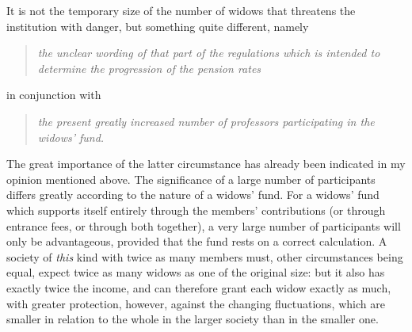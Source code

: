 It is not the temporary size of the number of widows that threatens the institution with danger, but something quite different, namely
\begin{quote}\textit{the unclear wording of that part of the regulations which is intended to determine the progression of the pension rates}\end{quote}
in conjunction with
\begin{quote}\raggedright\textit{the present greatly increased number of professors participating in the widows' fund.}\end{quote}
\noindent\hspace*{\parindent}The great importance of the latter circumstance has already been indicated in my opinion mentioned above. The significance of a large number of participants differs greatly according to the nature of a widows' fund. For a widows' fund which supports itself entirely through the members' contributions (or through entrance fees, or through both together), a very large number of participants will only be advantageous, provided that the fund rests on a correct calculation. A society of \textit{this} kind with twice as many members must, other circumstances being equal, expect twice as many widows as one of the original size: but it also has exactly twice the income, and can therefore grant each widow exactly as much, with greater protection, however, against the changing fluctuations, which are smaller in relation to the whole in the larger society than in the smaller one.

